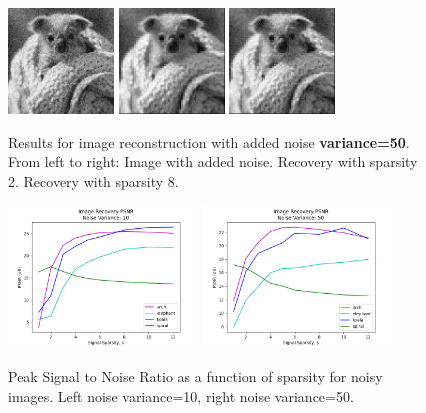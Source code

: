 \documentclass{article}
\begin{document}
\begin{figure}[H]
    \captionsetup{width=.75\linewidth}
    \centering
        \includegraphics[width=0.25\textwidth]{images/koala_noise-50.png}
        \includegraphics[width=0.25\textwidth]{images/koala_noise-50-recovered_02.png}
        \includegraphics[width=0.25\textwidth]{images/koala_noise-50-recovered_08.png}
        \caption{Results for image reconstruction with added noise {\bf variance=50}. From left to right: Image with added noise. Recovery with sparsity 2. Recovery with sparsity 8.}
\end{figure}


\begin{figure}[H]
    \captionsetup{width=.9\linewidth}
    \centering
        \includegraphics[width=0.45\textwidth]{plots/d3-noise-10.png}
        \includegraphics[width=0.45\textwidth]{plots/d3-noise-50.png}
        \caption{Peak Signal to Noise Ratio as a function of sparsity for noisy images. Left noise variance=10, right noise variance=50.}
\end{figure}
\end{document}
